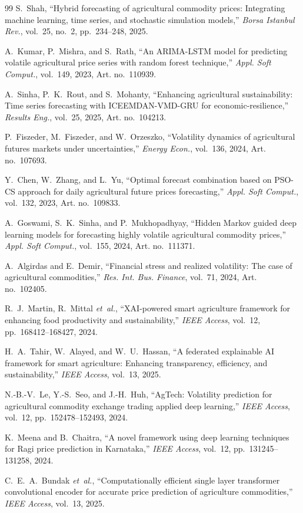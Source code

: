 \documentclass[12pt,a4paper]{report}
\begin{document}
\begin{thebibliography}{99}
 S.~Shah, ``Hybrid forecasting of agricultural commodity prices: Integrating machine learning, time series, and stochastic simulation models,'' \textit{Borsa Istanbul Rev.}, vol.~25, no.~2, pp.~234--248, 2025.

 A.~Kumar, P.~Mishra, and S.~Rath, ``An ARIMA-LSTM model for predicting volatile agricultural price series with random forest technique,'' \textit{Appl. Soft Comput.}, vol.~149, 2023, Art. no.~110939.

 A.~Sinha, P.~K.~Rout, and S.~Mohanty, ``Enhancing agricultural sustainability: Time series forecasting with ICEEMDAN-VMD-GRU for economic-resilience,'' \textit{Results Eng.}, vol.~25, 2025, Art. no.~104213.

 P.~Fiszeder, M.~Fiszeder, and W.~Orzeszko, ``Volatility dynamics of agricultural futures markets under uncertainties,'' \textit{Energy Econ.}, vol.~136, 2024, Art. no.~107693.

 Y.~Chen, W.~Zhang, and L.~Yu, ``Optimal forecast combination based on PSO-CS approach for daily agricultural future prices forecasting,'' \textit{Appl. Soft Comput.}, vol.~132, 2023, Art. no.~109833.

 A.~Goswami, S.~K.~Sinha, and P.~Mukhopadhyay, ``Hidden Markov guided deep learning models for forecasting highly volatile agricultural commodity prices,'' \textit{Appl. Soft Comput.}, vol.~155, 2024, Art. no.~111371.

 A.~Algirdas and E.~Demir, ``Financial stress and realized volatility: The case of agricultural commodities,'' \textit{Res. Int. Bus. Finance}, vol.~71, 2024, Art. no.~102405.

 R.~J.~Martin, R.~Mittal \textit{et~al.}, ``XAI-powered smart agriculture framework for enhancing food productivity and sustainability,'' \textit{IEEE Access}, vol.~12, pp.~168412--168427, 2024.

 H.~A.~Tahir, W.~Alayed, and W.~U.~Hassan, ``A federated explainable AI framework for smart agriculture: Enhancing transparency, efficiency, and sustainability,'' \textit{IEEE Access}, vol.~13, 2025.

 N.-B.-V.~Le, Y.-S.~Seo, and J.-H.~Huh, ``AgTech: Volatility prediction for agricultural commodity exchange trading applied deep learning,'' \textit{IEEE Access}, vol.~12, pp.~152478--152493, 2024.

 K.~Meena and B.~Chaitra, ``A novel framework using deep learning techniques for Ragi price prediction in Karnataka,'' \textit{IEEE Access}, vol.~12, pp.~131245--131258, 2024.

 C.~E.~A.~Bundak \textit{et~al.}, ``Computationally efficient single layer transformer convolutional encoder for accurate price prediction of agriculture commodities,'' \textit{IEEE Access}, vol.~13, 2025.

\end{thebibliography}
\end{document}
